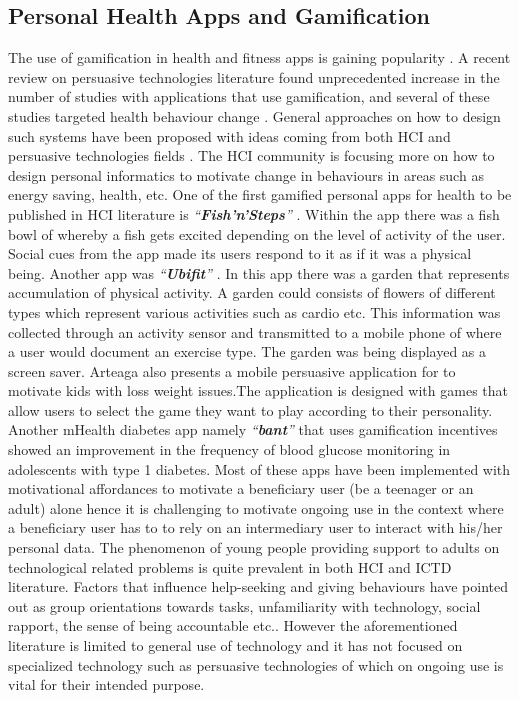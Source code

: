 \documentclass{sig-alternate}
\begin{document}
\subsection{Personal Health Apps and Gamification}  
The use of gamification in health and fitness apps is gaining popularity \cite{lister2014:just}. A recent review on persuasive technologies literature found unprecedented increase in the number of studies with applications that use gamification, and several of these studies targeted health behaviour change \cite{hamari2014persuasive}. General approaches on how to design such systems have been proposed with ideas coming from both HCI\cite{li2010:stage} and persuasive technologies fields \cite{fogg2009:behavior,Oinas-kukkonen:psd,Oinas-Kukkonen:foundation}.\newline 
The HCI community is focusing more on  how to design personal informatics to motivate change in behaviours in areas such as energy saving, health, etc. One of the first gamified personal apps for health to be published in HCI literature is \emph{``\textbf{Fish'n'Steps}''} \cite{lin2006:fish}. Within the app there  was a fish bowl of whereby a fish gets excited depending on the level of activity of the user. Social cues from the app made its users respond to it as if it was a physical being.\newline
Another app was \emph{``\textbf{Ubifit}''} \cite{klasnja2009:using}. In this app there was a garden that represents accumulation of physical activity. A garden could consists of flowers of different types which represent various activities such as cardio etc. This information was collected through an activity sensor and transmitted to a mobile phone of where a user would document an exercise type. The garden was being displayed as a screen saver.\newline
Arteaga \cite{arteaga2010:persuasive} also presents a mobile persuasive application for to motivate kids with loss weight issues.The application is designed with games that allow users to select the game they want to play according to their personality. Another mHealth diabetes app namely \emph{``\textbf{bant}''} that uses gamification incentives showed an improvement in the frequency of blood glucose monitoring in adolescents with type 1 diabetes.\newline
Most of these apps have been implemented with motivational affordances to motivate a beneficiary user (be a teenager or an adult) alone hence it is challenging to motivate ongoing use in the context where a beneficiary user has to to rely on an intermediary user to interact with his/her personal data. The phenomenon of young people providing support to adults on technological related problems is quite prevalent in both HCI and ICTD literature. Factors that influence help-seeking and giving behaviours have pointed out as group orientations towards tasks, unfamiliarity with technology, social rapport, the sense of being accountable etc.\cite{sambasivan2010,poole:chh,kiesler:twi,parikh2006}. However the aforementioned literature is limited to general use of technology and it has not focused on specialized technology such as persuasive technologies of which on ongoing use is vital for their intended purpose.\newline
\end{document}
